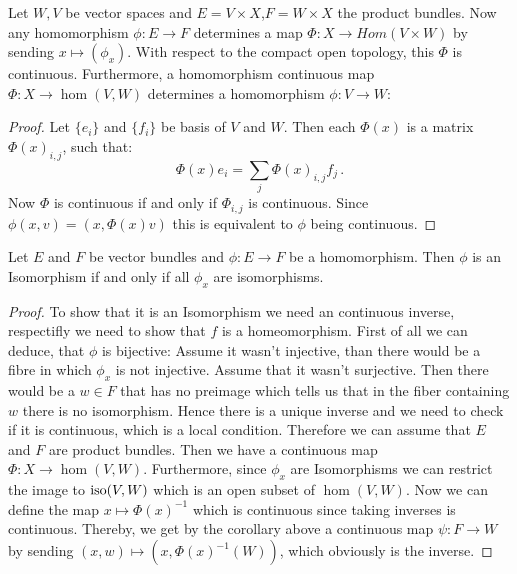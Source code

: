 \begin{definition}\label{def: Homomorphism Bundle}
	Let $W,V$ be vector spaces and $E=V\times X$,$F=W\times X$ the product bundles. Now any homomorphism $\phi:E\to F$ determines a map $\Phi:X\to Hom(V\times W)$ by sending $x\mapsto (\phi_x)$. With respect to the compact open topology, this $\Phi$ is continuous. Furthermore, a homomorphism continuous map $\Phi:X \to \hom(V,W)$ determines a homomorphism $\phi:V\to W$:
\end{definition}
\begin{proof}
	Let $\{e_i\}$ and $\{f_i\}$ be basis of $V$ and $W$. Then each $\Phi(x)$ is a matrix $\Phi(x)_{i,j}$, such that:
	\begin{equation*}
		\Phi(x)e_i=\sum_j\Phi(x)_{i,j}f_j\,.
	\end{equation*} Now $\Phi$ is continuous if and only if $\Phi_{i,j}$ is continuous. Since $\phi(x,v)=(x,\Phi(x)v)$ this is equivalent to $\phi$ being continuous. 
\end{proof}
\begin{theorem}\label{thm: Isomorphic vector-bundles}
	Let $E$ and $F$ be vector bundles and $\phi:E\to F$ be a homomorphism. Then $\phi$ is an Isomorphism if and only if all $\phi_x$ are isomorphisms. 
\end{theorem}
\begin{proof}
	To show that it is an Isomorphism we need an continuous inverse, respectifly we need to show that $f$ is a homeomorphism. First of all we can deduce, that $\phi$ is bijective:
	Assume it wasn't injective, than there would be a fibre in which $\phi_x$ is not injective. Assume that it wasn't surjective. Then there would be a $w\in F$ that has no preimage which tells us that in the fiber containing $w$ there is no isomorphism. Hence there is a unique inverse and we need to check if it is continuous, which is a local condition. Therefore we can assume that $E$ and $F$ are product bundles. Then we have a continuous map $\Phi:X\to \hom(V,W)$. Furthermore, since $\phi_x$ are Isomorphisms we can restrict the image to $\mathrm{iso}(V,W)$ which is an open subset of $\hom(V,W)$. Now we can define the map $x\mapsto \Phi(x)^{-1}$ which is continuous since taking inverses is continuous. Thereby, we get by the corollary above a continuous map $\psi:F\to W$ by sending $(x,w)\mapsto (x,\Phi(x)^{-1}(W))$, which obviously is the inverse. 
\end{proof}
